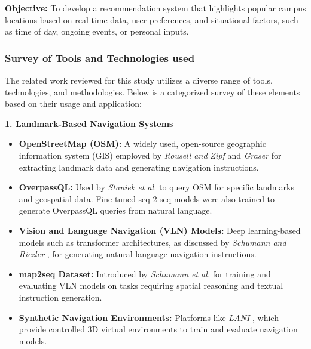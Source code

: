 \textbf{Objective:} To develop a recommendation system that highlights popular campus locations based on real-time data, user preferences, and situational factors, such as time of day, ongoing events, or personal inputs.


\subsubsection{Survey of Tools and Technologies used}
The related work reviewed for this study utilizes a diverse range of tools, technologies, and methodologies. Below is a categorized survey of these elements based on their usage and application:

\textbf{1. Landmark-Based Navigation Systems}
\begin{itemize}
	\item \textbf{OpenStreetMap (OSM):} A widely used, open-source geographic information system (GIS) employed by \textit{Rousell and Zipf} \cite{rousell-2017} and \textit{Graser} \cite{graser-2017} for extracting landmark data and generating navigation instructions.
	\item \textbf{OverpassQL:} Used by \textit{Staniek et al.} \cite{staniek-2024} to query OSM for specific landmarks and geospatial data. Fine tuned seq-2-seq models were also trained to generate OverpassQL queries from natural language.
	\item \textbf{Vision and Language Navigation (VLN) Models:} Deep learning-based models such as transformer architectures, as discussed by \textit{Schumann and Riezler} \cite{schumann-riezler-2021-generating}, for generating natural language navigation instructions.
	\item \textbf{map2seq Dataset:} Introduced by \textit{Schumann et al.} \cite{schumann-riezler-2022-map2seq-vln} for training and evaluating VLN models on tasks requiring spatial reasoning and textual instruction generation.
	\item \textbf{Synthetic Navigation Environments:} Platforms like \textit{LANI} \cite{misra-etal-2018-mapping}, which provide controlled 3D virtual environments to train and evaluate navigation models.
\end{itemize}

